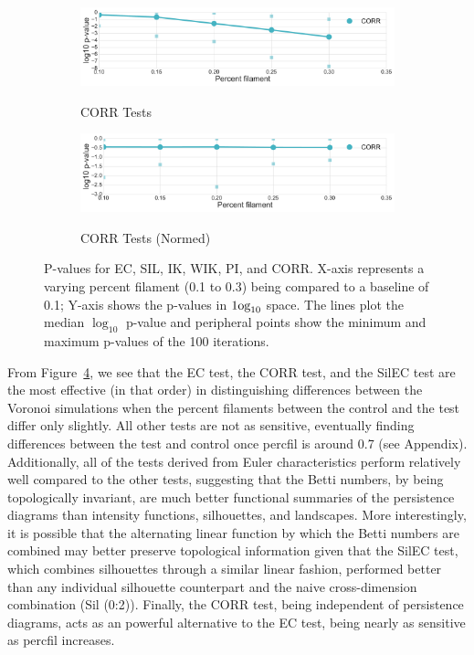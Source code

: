 \documentclass[12pt]{article}
\newcommand{\figref}[1]{Figure~\ref{#1}}
\begin{document}
\begin{center}
\begin{figure}[htp!]
\begin{subfigure}{.45\textwidth}
      \label{fig:sub_weight_normed}
    \end{subfigure}
    \begin{subfigure}{.45\textwidth}
      \caption{CORR Tests}
      \includegraphics[width=\linewidth]{figure_8_correlation_group.pdf}
      \label{fig:sub_corr}
    \end{subfigure}
    \begin{subfigure}{.45\textwidth}
      \caption{CORR Tests (Normed)}
      \includegraphics[width=\linewidth]{figure_8_correlation_group_normed.pdf}
      \label{fig:sub_corr_normed}
    \end{subfigure}
  \caption{P-values for EC, SIL, IK, WIK, PI, and CORR. X-axis represents a varying percent filament (0.1 to 0.3) being compared to a baseline of 0.1; Y-axis shows the p-values in $\textup{1og}_{10}$ space. The lines plot the median $\log_{10}$ p-value and peripheral points show the minimum and maximum p-values of the 100 iterations.}
  \label{fig:sub_unstandardized_results}
  \end{figure}
\end{center}

From \figref{fig:sub_unstandardized_results}, we see  that the EC test, the CORR test, and the SilEC test are the most effective (in that order) in distinguishing differences between the Voronoi simulations when the percent filaments between the control and the test differ only slightly. All other tests are not as sensitive, eventually finding differences between the test and control once percfil is around 0.7 (see Appendix). Additionally, all of the tests derived from Euler characteristics perform relatively well compared to the other tests, suggesting that the Betti numbers, by being topologically invariant, are much better functional summaries of the persistence diagrams than intensity functions, silhouettes, and landscapes. More interestingly, it is possible that the alternating linear function by which the Betti numbers are combined may better preserve topological information given that the SilEC test, which combines silhouettes through a similar linear fashion, performed better than any individual silhouette counterpart and the naive cross-dimension combination (Sil (0:2)). Finally, the CORR test, being independent of persistence diagrams, acts as an powerful alternative to the EC test, being nearly as sensitive as percfil increases.
\end{document}
